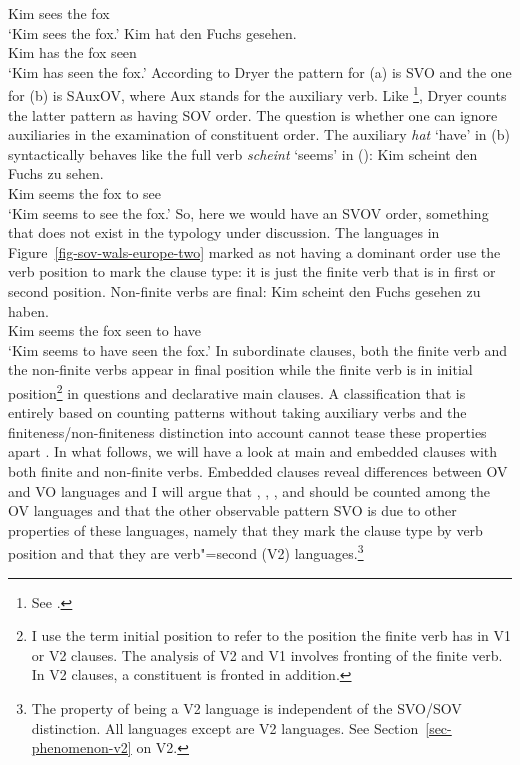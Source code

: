     Kim sees the fox\\
\glt `Kim sees the fox.'
\ex
\gll Kim hat den Fuchs gesehen.\\
     Kim has the fox seen\\
\glt `Kim has seen the fox.'
\zl
According to Dryer the pattern for (a) is SVO and the one for (b) is SAuxOV, where Aux
stands for the auxiliary verb. Like
\citet{Greenberg63a-u}\footnote{%
  See .
}, Dryer counts the latter pattern as having SOV order. The question is whether one can ignore auxiliaries
in the examination of constituent order. The auxiliary \emph{hat} `have' in (b) syntactically
behaves like the full verb \emph{scheint} `seems' in ():
\ea
\gll Kim scheint den Fuchs zu sehen.\\
     Kim seems   the fox  to see\\
\glt `Kim seems to see the fox.'
\z
So, here we would have an SVOV order, something that does not exist in the typology under discussion.
The languages in Figure~\ref{fig-sov-wals-europe-two} marked as not having a dominant order use the
verb position to mark the clause type: it is just the finite verb that is in first or second
position. Non-finite verbs are final: 
\ea
\gll Kim scheint den Fuchs gesehen zu haben.\\
     Kim seems   the fox  seen to have\\
\glt `Kim seems to have seen the fox.'
\z
In subordinate clauses, both the finite verb and the non-finite verbs appear in final position while
the finite verb is in initial position\footnote{%
  I use the term initial position to refer to the position the finite verb has in V1 or V2 clauses. The
  analysis of V2 and V1 involves fronting of the finite verb. In V2 clauses, a constituent is fronted
  in addition.
} in questions and declarative main clauses.
A classification that is entirely based on counting patterns without taking auxiliary verbs and the
finiteness/non-finiteness distinction into account cannot tease these properties apart \citep[Section~3]{HoehleTopo}. In what follows, we will have a look at main and embedded clauses with
both finite and non-finite verbs. Embedded clauses reveal differences between OV and VO languages and I will argue that , ,
, and  should be counted among the OV languages and that the other observable pattern
SVO is due to other properties of these languages, namely that they mark the clause type by verb
position and that they are verb"=second (V2) languages.\footnote{%
  The property of being a V2 language is independent of the SVO/SOV distinction. All 
  languages except  are V2 languages. See Section~\ref{sec-phenomenon-v2} on V2.
}

